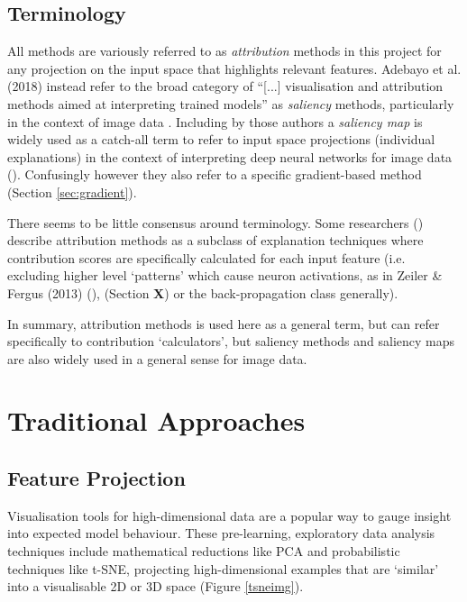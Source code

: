 \documentclass[main]{subfiles}
\begin{document}
\subsection*{Terminology}
All methods are variously referred to as \textit{attribution} methods in this project for any projection on the input space that highlights relevant features. Adebayo et al. (2018) instead refer to the broad category of ``[...] visualisation and attribution methods aimed at interpreting trained models'' as \textit{saliency} methods, particularly in the context of image data \cite{sanity}. Including by those authors a \textit{saliency map} is widely used as a catch-all term to refer to input space projections (individual explanations) in the context of interpreting deep neural networks for image data (\cite{sanity}). Confusingly however they also refer to a specific gradient-based method (Section \ref{sec:gradient}). 

There seems to be little consensus around terminology. Some researchers (\cite{patternnet}) describe attribution methods as a subclass of explanation techniques where contribution scores are specifically calculated for each input feature (i.e. excluding higher level `patterns' which cause neuron activations, as in Zeiler \& Fergus (2013) (\cite{zeilerfergus2013}), (Section \textbf{X}) or the back-propagation class generally). 

In summary, attribution methods is used here as a general term, but can refer specifically to contribution `calculators', but saliency methods and saliency maps are also widely used in a general sense for image data.

\section{Traditional Approaches}

\subsection{Feature Projection}
Visualisation tools for high-dimensional data are a popular way to gauge insight into expected model behaviour.  These pre-learning, exploratory data analysis techniques include mathematical reductions like PCA and probabilistic techniques like t-SNE,  projecting high-dimensional examples that are `similar' into a visualisable 2D or 3D space \cite{tsnepaper} (Figure \ref{tsneimg}).
\end{document}
